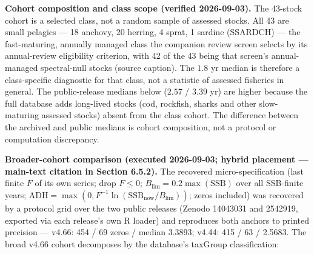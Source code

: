 \documentclass[11pt]{article}
\begin{document}
\textbf{Cohort composition and class scope (verified 2026-09-03).} The 43-stock cohort is a selected class, not a random sample of assessed stocks. All 43 are small pelagics --- 18 anchovy, 20 herring, 4 sprat, 1 sardine (SSARDCH) --- the fast-maturing, annually managed class the companion review screen selects by its annual-review eligibility criterion, with 42 of the 43 being that screen's annual-managed spectral-null stocks (source caption). The \(1.8\) yr median is therefore a class-specific diagnostic for that class, not a statistic of assessed fisheries in general. The public-release medians below (\(2.57\) / \(3.39\) yr) are higher because the full database adds long-lived stocks (cod, rockfish, sharks and other slow-maturing assessed stocks) absent from the class cohort. The difference between the archived and public medians is cohort composition, not a protocol or computation discrepancy.

\textbf{Broader-cohort comparison (executed 2026-09-03; hybrid placement --- main-text citation in Section 6.5.2).} The recovered micro-specification (last finite \(F\) of its own series; drop \(F \le 0\); \(B_{\lim} = 0.2\max(\mathrm{SSB})\) over all SSB-finite years; \(\mathrm{ADH} = \max(0, F^{-1}\ln(\mathrm{SSB}_{\mathrm{now}}/B_{\lim}))\); zeros included) was recovered by a protocol grid over the two public releases (Zenodo 14043031 and 2542919, exported via each release's own R loader) and reproduces both anchors to printed precision --- v4.66: 454 / 69 zeros / median 3.3893; v4.44: 415 / 63 / 2.5683. The broad v4.66 cohort decomposes by the database's taxGroup classification:
\end{document}
